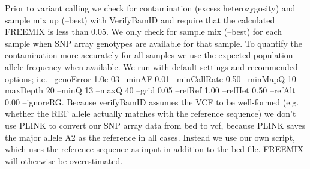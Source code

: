 Prior to variant calling we check for contamination (excess heterozygosity) and sample mix up (--best) with VerifyBamID and require that the calculated FREEMIX is less than 0.05. We only check for sample mix (--best) for each sample when SNP array genotypes are available for that sample. To quantify the contamination more accurately for all samples we use the expected population allele frequency when available. We run with default settings and recommended options; i.e. --genoError 1.0e-03 --minAF 0.01 --minCallRate 0.50 --minMapQ 10 --maxDepth 20 --minQ 13 --maxQ 40 --grid 0.05 --refRef 1.00 --refHet 0.50 --refAlt 0.00 --ignoreRG. Because verifyBamID assumes the VCF to be well-formed (e.g. whether the REF allele actually matches with the reference sequence) we don't use PLINK to convert our SNP array data from bed to vcf, because PLINK saves the major allele A2 as the reference in all cases. Instead we use our own script, which uses the reference sequence as input in addition to the bed file. FREEMIX will otherwise be overestimated.
